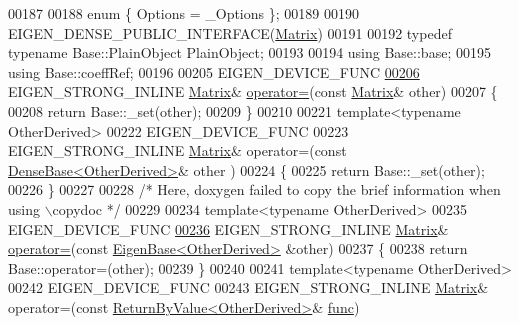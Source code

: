 \begin{DoxyCode}
00187 
00188     \textcolor{keyword}{enum} \{ Options = \_Options \};
00189 
00190     EIGEN\_DENSE\_PUBLIC\_INTERFACE(\hyperlink{group___core___module_class_eigen_1_1_matrix}{Matrix})
00191 
00192     \textcolor{keyword}{typedef} \textcolor{keyword}{typename} Base::PlainObject PlainObject;
00193 
00194     \textcolor{keyword}{using} Base::base;
00195     \textcolor{keyword}{using} Base::coeffRef;
00196 
00205     EIGEN\_DEVICE\_FUNC
\hyperlink{group___core___module_aa123b56b10819a0cbf5164abb242102f}{00206}     EIGEN\_STRONG\_INLINE \hyperlink{group___core___module_class_eigen_1_1_matrix}{Matrix}& \hyperlink{group___core___module_aa123b56b10819a0cbf5164abb242102f}{operator=}(\textcolor{keyword}{const} \hyperlink{group___core___module_class_eigen_1_1_matrix}{Matrix}& other)
00207     \{
00208       \textcolor{keywordflow}{return} Base::\_set(other);
00209     \}
00210 
00221     \textcolor{keyword}{template}<\textcolor{keyword}{typename} OtherDerived>
00222     EIGEN\_DEVICE\_FUNC
00223     EIGEN\_STRONG\_INLINE \hyperlink{group___core___module_class_eigen_1_1_matrix}{Matrix}& operator=(\textcolor{keyword}{const} \hyperlink{group___core___module_class_eigen_1_1_dense_base}{DenseBase<OtherDerived>}& other
      )
00224     \{
00225       \textcolor{keywordflow}{return} Base::\_set(other);
00226     \}
00227 
00228     \textcolor{comment}{/* Here, doxygen failed to copy the brief information when using \(\backslash\)copydoc */}
00229 
00234     \textcolor{keyword}{template}<\textcolor{keyword}{typename} OtherDerived>
00235     EIGEN\_DEVICE\_FUNC
\hyperlink{group___core___module_ae1be4ae99dbfc91c6a3a0d0af7165047}{00236}     EIGEN\_STRONG\_INLINE \hyperlink{group___core___module_class_eigen_1_1_matrix}{Matrix}& \hyperlink{group___core___module_ae1be4ae99dbfc91c6a3a0d0af7165047}{operator=}(\textcolor{keyword}{const} 
      \hyperlink{group___core___module_struct_eigen_1_1_eigen_base}{EigenBase<OtherDerived>} &other)
00237     \{
00238       \textcolor{keywordflow}{return} Base::operator=(other);
00239     \}
00240 
00241     \textcolor{keyword}{template}<\textcolor{keyword}{typename} OtherDerived>
00242     EIGEN\_DEVICE\_FUNC
00243     EIGEN\_STRONG\_INLINE \hyperlink{group___core___module_class_eigen_1_1_matrix}{Matrix}& operator=(\textcolor{keyword}{const} 
      \hyperlink{group___core___module_class_eigen_1_1_return_by_value}{ReturnByValue<OtherDerived>}& \hyperlink{structfunc}{func})

\end{DoxyCode}
